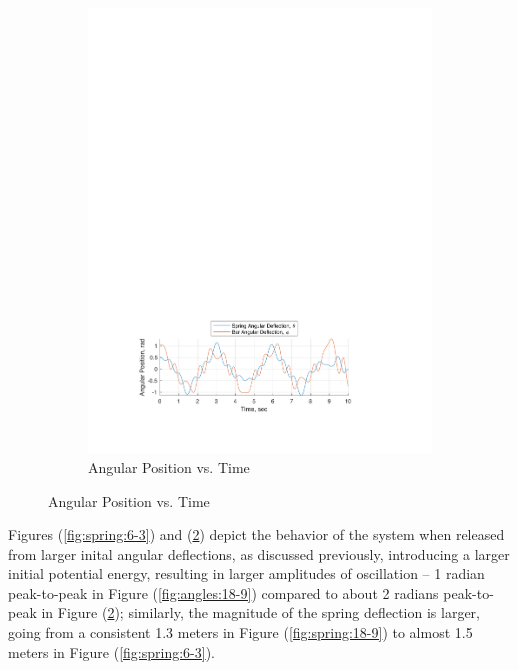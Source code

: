 \documentclass[12pt]{report}
\begin{document}
\begin{flushleft}
\begin{figure}[!ht]
\begin{subfigure}[t]{\textwidth}
  \includegraphics[center]{angles_6-3}
  \caption{Angular Position vs. Time}
  \label{fig:angles:6-3}
\end{subfigure}
\end{figure}


Figures (\ref{fig:spring:6-3}) and (\ref{fig:angles:6-3}) depict the behavior of the
system when released from larger inital angular deflections, as discussed previously,
introducing a larger initial potential energy, resulting in larger amplitudes of oscillation --
1 radian peak-to-peak in Figure (\ref{fig:angles:18-9}) compared to about 2 radians
peak-to-peak in Figure (\ref{fig:angles:6-3}); similarly, the magnitude of the spring
deflection is larger, going from a consistent 1.3 meters in Figure (\ref{fig:spring:18-9})
to almost 1.5 meters in Figure (\ref{fig:spring:6-3}).

\newpage


\end{flushleft}
\end{document}

